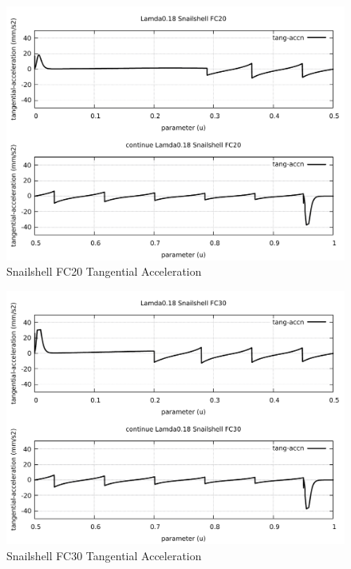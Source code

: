 \begin{figure}
	\caption     {Snailshell FC20 Tangential Acceleration}
	\label{22-img-Snailshell-FC20-Tangential-Acceleration.pdf}
	\includegraphics[width=1.00\textwidth]{Chap4/appendix/app-Snailshell/plots/22-img-Snailshell-FC20-Tangential-Acceleration.pdf}
\end{figure}

\clearpage
\pagebreak

\begin{figure}
	\caption     {Snailshell FC30 Tangential Acceleration}
	\label{23-img-Snailshell-FC30-Tangential-Acceleration.pdf}
	\includegraphics[width=1.00\textwidth]{Chap4/appendix/app-Snailshell/plots/23-img-Snailshell-FC30-Tangential-Acceleration.pdf}
\end{figure}


